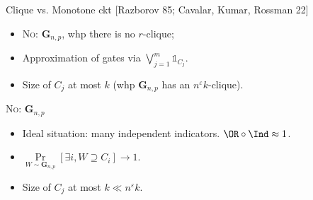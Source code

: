 \begin{frame}{Clique vs. Monotone ckt [Razborov 85; Cavalar, Kumar, Rossman 22]}

    \begin{center}
                
    \end{center}


    \pause
    \begin{itemize}
        \item \textsc{No}: $\mathbf{G}_{n, p}$, whp there is no $r$-clique;
            \pause
        \item Approximation of gates via $\bigvee\limits_{j = 1}^{m} \mathds{1}_{C_j}$.
        \item Size of $C_j$ at most $k$ (whp $\mathbf{G}_{n, p}$ has an $n^{\varepsilon} k$-clique).
    \end{itemize}
\end{frame}


\begin{frame}{\textsc{No}: $\mathbf{G}_{n, p}$}

    \begin{center}
                
    \end{center}


    \pause
    \begin{itemize}
        \item Ideal situation: many independent indicators. \alert{$\OR \circ \Ind \approx 1$}.
            \pause
        \item $\Pr\limits_{W \sim \mathbf{G}_{n, p}}[\exists i, W \supseteq C_i] \to 1$.
        \item Size of $C_j$ at most $k \ll n^{\varepsilon}k$.
    \end{itemize}
\end{frame}

